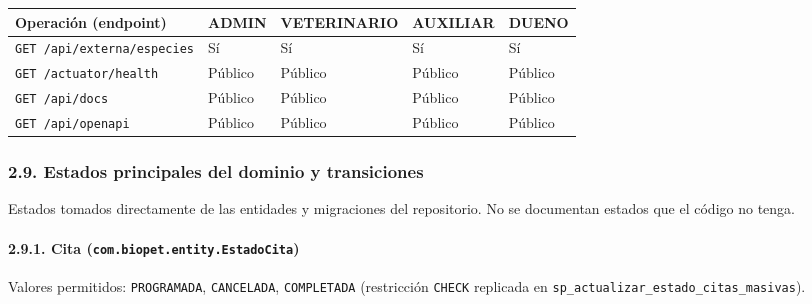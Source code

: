 \documentclass[
  spanish,
]{article}
\newcounter{none} %
\begin{document}
{\def\LTcaptype{none} %
\begin{longtable}[]{@{}lllll@{}}
\toprule\noalign{}
Operación (endpoint) & ADMIN & VETERINARIO & AUXILIAR & DUENO \\
\midrule\noalign{}
\endhead
\bottomrule\noalign{}
\endlastfoot
\texttt{GET\ /\allowbreak{}api/\allowbreak{}externa/\allowbreak{}especies} & Sí & Sí & Sí & Sí \\
\texttt{GET\ /\allowbreak{}actuator/\allowbreak{}health} & Público & Público & Público &
Público \\
\texttt{GET\ /\allowbreak{}api/\allowbreak{}docs} & Público & Público & Público & Público \\
\texttt{GET\ /\allowbreak{}api/\allowbreak{}openapi} & Público & Público & Público & Público \\
\end{longtable}
}

\subsubsection{2.9. Estados principales del dominio y
transiciones}\label{estados-principales-del-dominio-y-transiciones}

Estados tomados directamente de las entidades y migraciones del
repositorio. No se documentan estados que el código no tenga.

\paragraph{\texorpdfstring{2.9.1. Cita
(\texttt{com.\allowbreak{}biopet.\allowbreak{}entity.\allowbreak{}Estado\allowbreak{}Cita})}{2.9.1. Cita (com.biopet.entity.EstadoCita)}}\label{cita-com.biopet.entity.estadocita}

Valores permitidos: \texttt{PROGRAMADA}, \texttt{CANCELADA},
\texttt{COMPLETADA} (restricción \texttt{CHECK} replicada en
\texttt{sp\_\allowbreak{}actualizar\_\allowbreak{}esta\allowbreak{}do\_\allowbreak{}citas\_\allowbreak{}masivas}).
\end{document}

